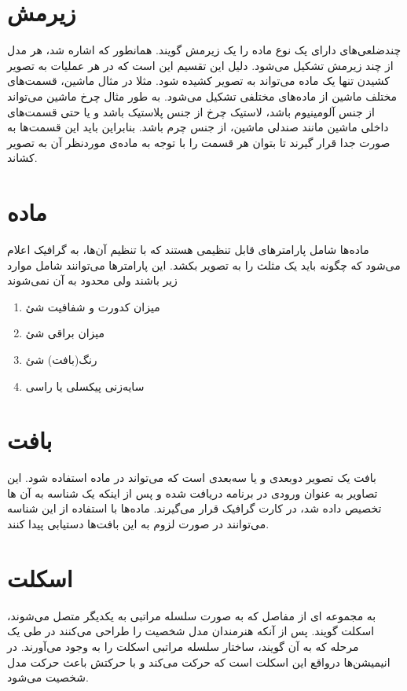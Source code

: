 \section{زیرمش
\protect{}
}
چندضلعی‌های دارای یک نوع ماده
را یک زیرمش گویند.
همانطور که اشاره شد، هر مدل از چند زیرمش تشکیل می‌شود. دلیل این تقسیم این است که در هر عملیات به تصویر کشیدن
تنها یک ماده می‌تواند به تصویر کشیده شود. مثلا در مثال ماشین، قسمت‌های مختلف ماشین از ماده‌های مختلفی تشکیل می‌شود. به طور مثال چرخ ماشین می‌تواند از جنس آلومینیوم باشد، لاستیک چرخ از جنس پلاستیک باشد و یا حتی قسمت‌های داخلی ماشین مانند صندلی ماشین، از جنس چرم باشد.
بنابراین باید این قسمت‌ها به صورت جدا قرار گیرند تا بتوان هر قسمت را با توجه به ماده‌ی موردنظر آن به تصویر کشاند.

\section{ماده 
\protect{}
}
ماده‌ها شامل پارامتر‌های قابل تنظیمی هستند که با تنظیم آن‌ها، به گرافیک اعلام می‌شود که چگونه باید یک مثلث را به تصویر بکشد.
این پارامترها می‌توانند شامل موارد زیر باشند ولی محدود به آن نمی‌شوند

\begin{enumerate}
	\item میزان کدورت و شفافیت شئ
 	\item میزان براقی شئ
 	\item رنگ(بافت) شئ
 	\item سایه‌زنی پیکسلی یا راسی \protect{}
\end{enumerate}


\section{بافت
\protect{}
}
بافت یک تصویر دوبعدی و یا سه‌بعدی است که می‌تواند در ماده استفاده شود.
این تصاویر به عنوان ورودی در برنامه دریافت شده و پس از اینکه یک شناسه به آن ها تخصیص داده شد، در کارت گرافیک قرار می‌گیرند. ماده‌ها با استفاده از این شناسه می‌توانند در صورت لزوم به این بافت‌ها دستیابی پیدا کنند.


\section{اسکلت}

به مجمو‌عه ای از مفاصل که به صورت سلسله مراتبی به یکدیگر متصل می‌شوند، اسکلت گویند. پس از آنکه هنرمندان مدل شخصیت را طراحی می‌کنند در طی یک مرحله که به آن
گویند، ساختار سلسله مراتبی اسکلت را به وجود می‌آورند.
در انیمیشن‌ها درواقع این اسکلت‌ است که حرکت می‌کند و با حرکتش باعث حرکت مدل شخصیت می‌شود.



